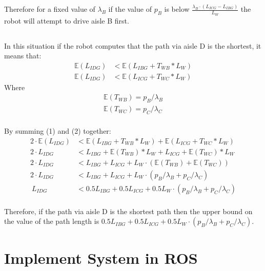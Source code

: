 \documentclass{article}
\begin{document}
Therefore for a fixed value of $\lambda_{B}$ if the value of $p_{B}$ is below $\frac{\lambda_{B}  \cdot (L_{ICG} - L_{IBG})}{L_{W}}$ the robot will attempt to drive aisle B first.

\subsection{}

In this situation if the robot computes that the path via aisle D is the shortest, it means that:
\begin{align}
\mathbb{E}(L_{IDG}) &< \mathbb{E}(L_{IBG} + T_{WB} * L_{W})	\\
\mathbb{E}(L_{IDG}) &< \mathbb{E}(L_{ICG} + T_{WC} * L_{W})
\end{align}
Where
\begin{align*}
\mathbb{E}(T_{WB}) = p_{B} / \lambda_{B}	\\
\mathbb{E}(T_{WC}) = p_{C} / \lambda_{C}	\\
\end{align*}

By summing (1) and (2) together:
\begin{align*}
2 \cdot \mathbb{E}(L_{IDG}) &<  \mathbb{E}(L_{IBG} + T_{WB} * L_{W}) + \mathbb{E}(L_{ICG} + T_{WC} * L_{W}) \\
2 \cdot L_{IDG} &< L_{IBG} + \mathbb{E}(T_{WB}) * L_{W} + L_{ICG} + \mathbb{E}(T_{WC}) * L_{W}	\\
2 \cdot L_{IDG} &< L_{IBG} + L_{ICG} + L_{W} \cdot (\mathbb{E}(T_{WB}) + \mathbb{E}(T_{WC})) 	\\
2 \cdot L_{IDG} &< L_{IBG} + L_{ICG} + L_{W} \cdot (p_{B} / \lambda_{B}+p_{C} / \lambda_{C}) 	\\\
L_{IDG} &< 0.5L_{IBG} + 0.5L_{ICG} + 0.5L_{W} \cdot (p_{B} / \lambda_{B}+p_{C} / \lambda_{C}) 	\\
\end{align*}

Therefore, if the path via aisle D is the shortest path then the upper bound on the value of the path length is $0.5L_{IBG} + 0.5L_{ICG} + 0.5L_{W} \cdot (p_{B} / \lambda_{B}+p_{C} / \lambda_{C}) $.


\newpage
\section{Implement System in ROS}
\end{document}
